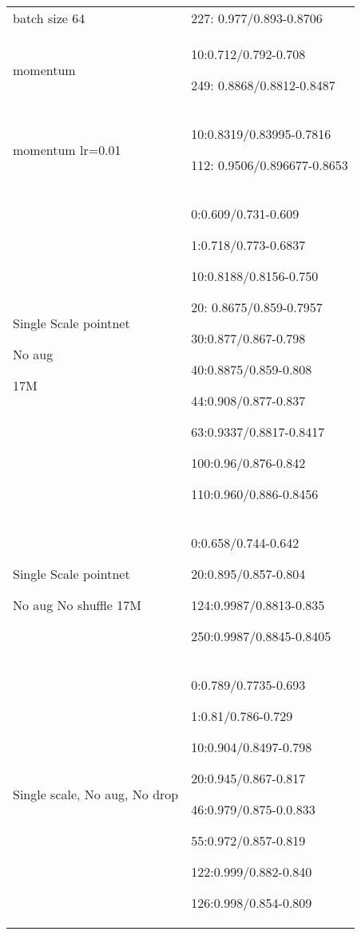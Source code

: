 \documentclass[,table,dvipsnames]{article}
\begin{document}
\begin{tabular}{|p{10cm}|p{5.5cm}| }
	\rowcolor{green!20}
	batch size 64 & 227: 0.977/0.893-0.8706\\
	
	\rowcolor{yellow!20}
	momentum & 10:0.712/0.792-0.708\par 249: 0.8868/0.8812-0.8487\\
	
	\rowcolor{green!20}
	momentum lr=0.01 & 10:0.8319/0.83995-0.7816\par 112: 0.9506/0.896677-0.8653\\
	
	\rowcolor{orange}
	Single Scale pointnet\par No aug \par 17M& 0:0.609/0.731-0.609\par 1:0.718/0.773-0.6837\par 10:0.8188/0.8156-0.750\par  20: 0.8675/0.859-0.7957 \par 30:0.877/0.867-0.798\par 40:0.8875/0.859-0.808 \par 44:0.908/0.877-0.837\par 63:0.9337/0.8817-0.8417\par 100:0.96/0.876-0.842 \par 110:0.960/0.886-0.8456\\
	
	\rowcolor{green!20}
	Single Scale pointnet \par No aug No shuffle 17M& 0:0.658/0.744-0.642\par 20:0.895/0.857-0.804\par 124:0.9987/0.8813-0.835\par 250:0.9987/0.8845-0.8405\\
	
	\rowcolor{yellow!20}
	Single scale, No aug, No drop &
	0:0.789/0.7735-0.693\par 1:0.81/0.786-0.729\par 10:0.904/0.8497-0.798\par 20:0.945/0.867-0.817 \par 46:0.979/0.875-0.0.833\par 55:0.972/0.857-0.819\par 122:0.999/0.882-0.840\par 126:0.998/0.854-0.809\\
		
	\hline 	
\end{tabular}
\end{document}
